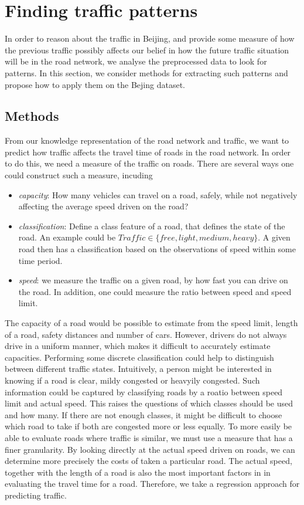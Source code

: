\section{Finding traffic patterns}\label{traffic-patterns}
In order to reason about the traffic in Beijing, and provide some measure of how the previous traffic possibly affects our belief in how the future traffic situation will be in the road network, we analyse the preprocessed data to look for patterns. In this section, we consider methods for extracting such patterns and propose how to apply them on the Bejing dataset.
\subsection{Methods}\label{patterns:methods}
From our knowledge representation of the road network and traffic, we want to predict how traffic affects the travel time of roads in the road network. In order to do this, we need a measure of the traffic on roads. There are several ways one could construct such a measure, incuding
\begin{itemize}
\item \emph{capacity}: How many vehicles can travel on a road, safely, while not negatively affecting the average speed driven on the road?
\item \emph{classification}: Define a class feature of a road, that defines the state of the road. An example could be $Traffic \in \{free, light, medium, heavy\}$. A given road then has a classification based on the observations of speed within some time period.
\item \emph{speed}: we measure the traffic on a given road, by how fast you can drive on the road. In addition, one could measure the ratio between speed and speed limit.
\end{itemize}
The capacity of a road would be possible to estimate from the speed limit, length of a road, safety distances and number of cars. However, drivers do not always drive in a uniform manner, which makes it difficult to accurately estimate capacities.
Performing some discrete classification could help to distinguish between different traffic states. Intuitively, a person might be interested in knowing if a road is clear, mildy congested or heavyily congested. Such information could be captured by classifying roads by a roatio between speed limit and actual speed. This raises the questions of which classes should be used and how many. If there are not enough classes, it might be difficult to choose which road to take if both are congested more or less equally.
To more easily be able to evaluate roads where traffic is similar, we must use a measure that has a finer granularity. By looking directly at the actual speed driven on roads, we can determine more precisely the costs of taken a particular road. The actual speed, together with the length of a road is also the most important factors in in evaluating the travel time for a road. Therefore, we take a regression approach for predicting traffic.
